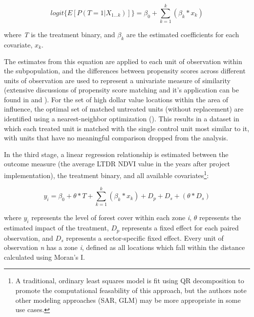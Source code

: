\documentclass{article}\usepackage[]{graphicx}\usepackage[]{color}
\newenvironment{knitrout}{}{}  %
\begin{document}
\begin{knitrout}
\begin{equation}
logit \Bigg \{ {E} [P(T=1 | X_{1...k})] \Bigg \}= \beta_{0} + \sum_{k=1}^{k}(\beta_{k}*x_{k})
\label{EQpropensity}
\end{equation}

where \textit{T} is the treatment binary, and \begin{math}\beta_{k}\end{math} are the estimated coefficients for each covariate, \begin{math}x_{k}\end{math}.  

The estimates from this equation are applied to each unit of observation within the subpopulation, and the differences between propensity scores across different units of observation are used to represent a univariate measure of similarity (extensive discussions of propensity score matching and it's application can be found in \cite{rubin_estimating_1997} and \cite{abbay_does_2015}).  
For the set of high dollar value locations within the area of influence, the optimal set of matched untreated units (without replacement) are identified using a nearest-neighbor optimization (\cite{ho_matchit:_2011}). 
This results in a dataset in which each treated unit is matched with the single control unit most similar to it, with units that have no meaningful comparison dropped from the analysis.
\par

In the third stage, a linear regression relationship is estimated between the outcome measure (the average LTDR NDVI value in the years after project implementation), the treatment binary, and all available covariates\footnote{A traditional, ordinary least squares model is fit using QR decomposition to promote the computational feasability of this approach, but the authors note other modeling approaches (SAR, GLM) may be more appropriate in some use cases.}:

\begin{equation}
y_i = \beta_{0} + \theta * T + \sum_{k=1}^{k}(\beta_{k}*x_{k}) + D_{p} + D_{s} + (\theta * D_{s})
\label{EQgwr}
\end{equation}

where \begin{math}y_{i}\end{math} represents the level of forest cover within each zone \textit{i}, \begin{math}\theta\end{math} represents the estimated impact of the treatment, \begin{math}D_{p}\end{math} represents a fixed effect for each paired observation, and \begin{math}D_{s}\end{math} represents a sector-specific fixed effect.
Every unit of observation \textit{n} has a zone \textit{i}, defined as all locations which fall within the distance calculated using Moran's I.


\end{knitrout}
\end{document}
